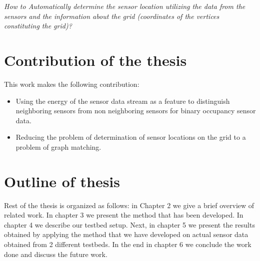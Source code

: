 \textit{How to Automatically determine the sensor location utilizing the data from the sensors and the information about the grid (coordinates of the vertices constituting the grid)?}

\section{Contribution of the thesis}
This work makes the following contribution:
\begin{itemize}
\item Using the energy of the sensor data stream as a feature to distinguish neighboring sensors from non neighboring sensors for binary occupancy sensor data.
\item Reducing the problem of determination of sensor locations  on the grid to a problem of graph matching.
\end{itemize}

\section{Outline of thesis}

Rest of the thesis is organized as follows: in Chapter 2 we give a brief overview of related work. In chapter 3 we present the method that has been developed. In chapter 4 we describe our testbed setup. Next, in chapter 5 we present the results obtained by applying the method that we have developed on actual sensor data obtained from 2 different testbeds. In the end in chapter 6 we conclude the work done and discuss the future work.






\vspace{1\baselineskip}

\noindent

